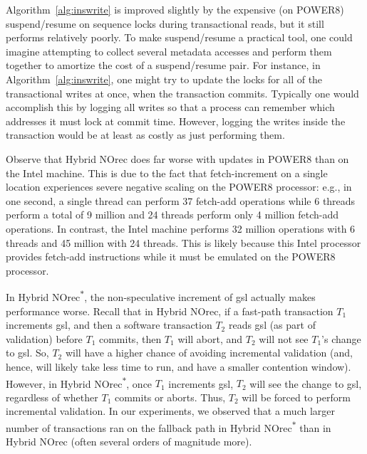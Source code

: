 Algorithm~\ref{alg:inswrite} is improved slightly by the expensive (on POWER8) suspend/resume on sequence locks during transactional reads, but it still performs relatively poorly. 
To make suspend/resume a practical tool, one could imagine attempting to 
collect several metadata accesses and perform them together to amortize the cost of a suspend/resume pair. For instance, 
in Algorithm~\ref{alg:inswrite}, one might try to update the locks for all of the transactional writes at once, when the transaction commits. 
Typically one would accomplish this by logging all writes so that a process can remember which addresses it must lock at commit time. 
However, logging the writes inside the transaction would be at least as costly as just performing them.

Observe that Hybrid NOrec does far worse with updates in POWER8 than on the Intel machine.
This is due to the fact that fetch-increment on a single location experiences severe negative scaling on the POWER8 processor: e.g., in one second, a single
thread can perform 37 fetch-add operations while 6 threads perform a total of 9 million and 24 threads perform only 4 million fetch-add operations.
In contrast, the Intel machine performs 32 million operations with 6 threads and 45 million with 24 threads. This is likely because this Intel processor provides 
fetch-add instructions while it must be emulated on the POWER8 processor.

In Hybrid NOrec\textsuperscript{$\ast$}, the non-speculative increment of gsl actually makes performance worse. Recall that in Hybrid NOrec, 
if a fast-path transaction $T_1$ increments gsl, and then a software transaction $T_2$ reads gsl (as part of validation) before $T_1$ commits, then $T_1$ will abort, 
and $T_2$ will not see $T_1$'s change to gsl. 
So, $T_2$ will have a higher chance of avoiding incremental validation (and, hence, will likely take less time to run, and have a smaller contention window).
However, in Hybrid NOrec\textsuperscript{$\ast$}, once $T_1$ increments gsl, $T_2$ will see the change to gsl, regardless of whether $T_1$ commits or aborts. Thus, 
$T_2$ will be forced to perform incremental validation. In our experiments, we observed that a much larger number of transactions ran on 
the fallback path in Hybrid NOrec\textsuperscript{$\ast$} than in Hybrid NOrec (often several orders of magnitude more).

